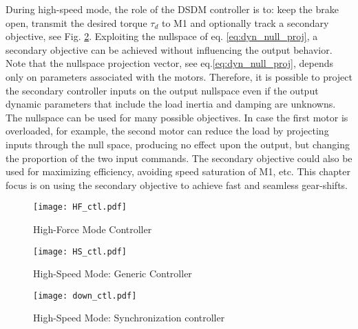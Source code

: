 During high-speed mode, the role of the DSDM controller is to: keep the brake open, transmit the desired torque $\tau_d$ to M1 and optionally track a secondary objective, see Fig. \ref{fig:HS_loop}. Exploiting the nullspace of eq. \eqref{eq:dyn_null_proj}, a secondary objective can be achieved without influencing the output behavior. Note that the nullspace projection vector, see eq.\eqref{eq:dyn_null_proj}, depends only on parameters associated with the motors. Therefore, it is possible to project the secondary controller inputs on the output nullspace even if the output dynamic parameters that include the load inertia and damping are unknowns. 
%
The nullspace can be used for many possible objectives. In case the first motor is overloaded, for example, the second motor can reduce the load by projecting inputs through the null space, producing no effect upon the output, but changing the proportion of the two input commands. The secondary objective could also be used for maximizing efficiency, avoiding speed saturation of M1, etc. This chapter focus is on using the secondary objective to achieve fast and seamless gear-shifts.



\begin{figure}[p]
	\centering
		\texttt{[image: HF\_ctl.pdf]}
	\caption{High-Force Mode Controller}
	\label{fig:HF_loop}
\end{figure}

\begin{figure}[p]
	\centering
		\texttt{[image: HS\_ctl.pdf]}
	\caption{High-Speed Mode: Generic Controller}
	\label{fig:HS_loop}
\end{figure}

\begin{figure}[p]
	\centering
		\texttt{[image: down\_ctl.pdf]}
	\caption{High-Speed Mode: Synchronization controller}
	\label{fig:down_loop}
\end{figure}

